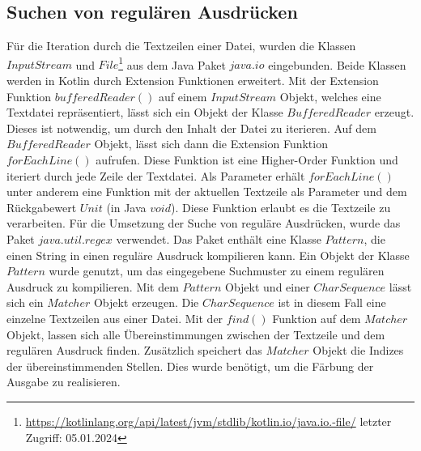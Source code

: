 \documentclass{article}
\begin{document}
\subsection{Suchen von regulären Ausdrücken}
Für die Iteration durch die Textzeilen einer Datei, wurden die Klassen $InputStream$ und $File$\footnote{\url{https://kotlinlang.org/api/latest/jvm/stdlib/kotlin.io/java.io.-file/} letzter Zugriff: 05.01.2024} aus dem Java Paket $java.io$ eingebunden. Beide Klassen werden in Kotlin durch Extension Funktionen erweitert. Mit der Extension Funktion $bufferedReader()$ auf einem $InputStream$ Objekt, welches eine Textdatei repräsentiert, lässt sich ein Objekt der Klasse $BufferedReader$ erzeugt. Dieses ist notwendig, um durch den Inhalt der Datei zu iterieren. Auf dem $BufferedReader$ Objekt, lässt sich dann die Extension Funktion $forEachLine()$ aufrufen. Diese Funktion ist eine Higher-Order Funktion und iteriert durch jede Zeile der Textdatei. Als Parameter erhält $forEachLine()$ unter anderem eine Funktion mit der aktuellen Textzeile als Parameter und dem Rückgabewert $Unit$ (in Java $void$). Diese Funktion erlaubt es die Textzeile zu verarbeiten. \newline
Für die Umsetzung der Suche von reguläre Ausdrücken, wurde das Paket $java.util.regex$ verwendet. Das Paket enthält eine Klasse $Pattern$, die einen String in einen reguläre Ausdruck kompilieren kann. Ein Objekt der Klasse $Pattern$ wurde genutzt, um das eingegebene Suchmuster zu einem regulären Ausdruck zu kompilieren. Mit dem $Pattern$ Objekt und einer $CharSequence$ lässt sich ein $Matcher$ Objekt erzeugen. Die $CharSequence$ ist in diesem Fall eine einzelne Textzeilen aus einer Datei. Mit der $find()$ Funktion auf dem $Matcher$ Objekt, lassen sich alle Übereinstimmungen zwischen der Textzeile und dem regulären Ausdruck finden. Zusätzlich speichert das $Matcher$ Objekt die Indizes der übereinstimmenden Stellen. Dies wurde benötigt, um die Färbung der Ausgabe zu realisieren.
\end{document}
